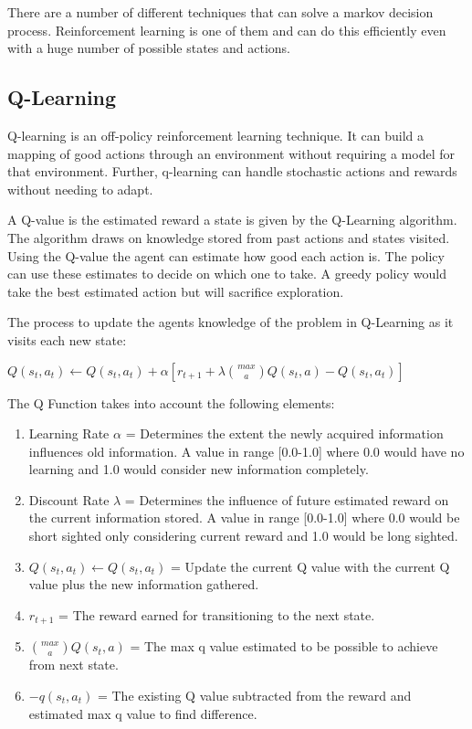 \documentclass{report}
\begin{document}
There are a number of different techniques that can solve a markov decision process. Reinforcement learning is one of them and can do this efficiently even with a huge number of possible states and actions.

\subsection{Q-Learning}

Q-learning is an off-policy reinforcement learning technique. It can build a mapping of good actions through an environment without requiring a model for that environment. Further, q-learning can handle stochastic actions and rewards without needing to adapt.

A Q-value is the estimated reward a state is given by the Q-Learning algorithm. The algorithm draws on knowledge stored from past actions and states visited.\\
Using the Q-value the agent can estimate how good each action is. The policy can use these estimates to decide on which one to take. A greedy policy would 
take the best estimated action but will sacrifice exploration.

The process to update the agents knowledge of the problem in Q-Learning as it visits each new state:

\vspace{0.5cm}

\centerline{ $Q(s_t, a_t) \leftarrow Q(s_t, a_t) + \alpha[r_{t+1} + \lambda \binom{max}{a} Q(s_t, a) - Q(s_t, a_t)]$ }

The Q Function takes into account the following elements: 
\begin{enumerate}
	\item Learning Rate $\alpha$ = Determines the extent the newly acquired information influences old information. A value in range [0.0-1.0] where 0.0 would have no learning and 1.0 would consider new information completely.
	\item Discount Rate $\lambda$ = Determines the influence of future estimated reward on the current information stored. A value in range [0.0-1.0] where 0.0 would be short sighted only considering current reward and 1.0 would be long sighted.
	\item $Q(s_t, a_t) \leftarrow Q(s_t, a_t)$ = Update the current Q value with the current Q value plus the new information gathered.
	\item $r_{t+1}$ = The reward earned for transitioning to the next state.
	\item $\binom{max}{a} Q(s_t, a)$ = The max q value estimated to be possible to achieve from next state.
	\item $-q(s_t, a_t)$ = The existing Q value subtracted from the reward and estimated max q value to find difference.
\end{enumerate}
\end{document}
